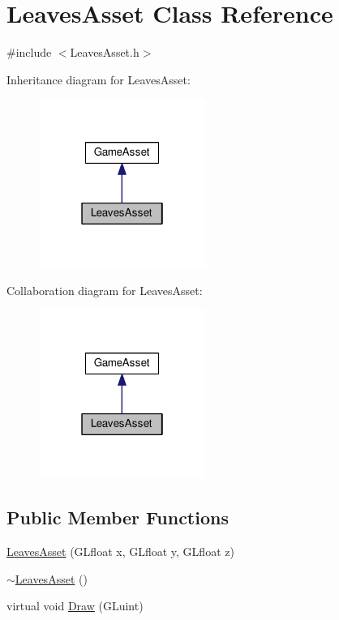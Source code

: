 \hypertarget{classLeavesAsset}{}\section{Leaves\+Asset Class Reference}
\label{classLeavesAsset}


{\ttfamily \#include $<$Leaves\+Asset.\+h$>$}



Inheritance diagram for Leaves\+Asset\+:\nopagebreak
\begin{figure}[H]
\begin{center}
\leavevmode
\includegraphics[width=154pt]{classLeavesAsset__inherit__graph}
\end{center}
\end{figure}


Collaboration diagram for Leaves\+Asset\+:\nopagebreak
\begin{figure}[H]
\begin{center}
\leavevmode
\includegraphics[width=154pt]{classLeavesAsset__coll__graph}
\end{center}
\end{figure}
\subsection*{Public Member Functions}
\begin{DoxyCompactItemize}
\item 
\hyperlink{classLeavesAsset_a1fb1212e5399f16071f0be7ff42cc344}{Leaves\+Asset} (G\+Lfloat x, G\+Lfloat y, G\+Lfloat z)
\item 
\hyperlink{classLeavesAsset_ae98d43a307f4c75cc8a661f0b36a213a}{$\sim$\+Leaves\+Asset} ()
\item 
virtual void \hyperlink{classLeavesAsset_a807fd196b83e5adb131d489ef6645742}{Draw} (G\+Luint)
\end{DoxyCompactItemize}
